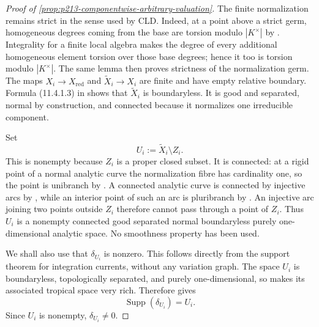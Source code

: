 \begin{proof}[Proof of
\cref{prop:p213-componentwise-arbitrary-valuation}]
The finite normalization remains strict in the sense used by CLD.  Indeed,
at a point above a strict germ, homogeneous degrees coming from the base
are torsion modulo $|K^\times|$ by
\cite[Lemma~11.8.5]{CLD25}.  Integrality for a finite local algebra makes
the degree of every additional homogeneous element torsion over those
base degrees; hence it too is torsion modulo $|K^\times|$.  The same lemma
then proves strictness of the normalization germ.  The maps
$X_i\to X_{\mathrm{red}}$ and $\widetilde X_i\to X_i$ are finite and have
empty relative boundary.  Formula (11.4.1.3) in \cite{CLD25} shows that
$\widetilde X_i$ is boundaryless.  It is good and separated, normal by
construction, and connected because it normalizes one irreducible
component.

Set
\begin{equation}
 \label{eq:p213-componentwise-av-normal-open}
                         U_i:=\widetilde X_i\setminus Z_i.
\end{equation}
This is nonempty because $Z_i$ is a proper closed subset.  It is connected:
at a rigid point of a normal analytic curve the normalization fibre has
cardinality one, so the point is unibranch by
\cite[Proposition~3.5.2]{Ducros24CurveStructure}.  A connected analytic
curve is connected by injective arcs by
\cite[Theorem~3.5.1 and \S1.3.5]{Ducros24CurveStructure}, while an interior
point of such an arc is pluribranch by
\cite[\S1.3.12]{Ducros24CurveStructure}.  An injective arc joining two
points outside $Z_i$ therefore cannot pass through a point of $Z_i$.
Thus $U_i$ is a nonempty connected good separated normal boundaryless
purely one-dimensional analytic space.  No smoothness property has been
used.

We shall also use that $\delta_{U_i}$ is nonzero.  This follows directly
from the support theorem for integration currents, without any variation
graph.  The space $U_i$ is boundaryless, topologically separated, and
purely one-dimensional, so \cite[Theorem~12.11.1]{CLD25} makes its
associated tropical space very rich.  Therefore
\cite[Corollary~7.3.13]{CLD25} gives
\begin{equation}
 \label{eq:p213-componentwise-av-nonzero-integration}
                         \operatorname{Supp}(\delta_{U_i})=U_i.
\end{equation}
Since $U_i$ is nonempty, $\delta_{U_i}\ne0$.


\end{proof}
